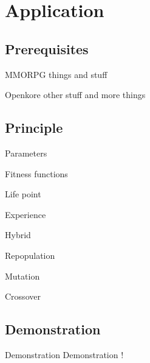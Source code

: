 \section{Application}

\subsection{Prerequisites}

\begin{frame}{MMORPG}
  things and stuff
\end{frame}

\begin{frame}{Openkore}
  other stuff and more things
\end{frame}

\subsection{Principle}

\begin{frame}{Parameters}
\end{frame}

\begin{frame}{Fitness functions}

  \begin{block}{Life point}
  \end{block}

  \begin{block}{Experience}
  \end{block}

  \begin{block}{Hybrid}
  \end{block}

\end{frame}

\begin{frame}{Repopulation}

  \begin{block}{Mutation}
  \end{block}

  \begin{block}{Crossover}
  \end{block}

\end{frame}

\subsection{Demonstration}

\begin{frame}{Demonstration}
  Demonstration !
\end{frame}
